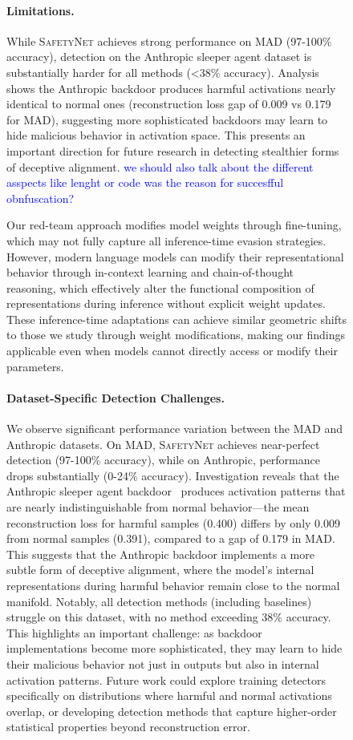\begin{figure}[htbp]
{\paragraph{Limitations.}
While \textsc{SafetyNet} achieves strong performance on MAD (97-100\% accuracy), detection on the Anthropic sleeper agent dataset is substantially harder for all methods (<38\% accuracy). Analysis shows the Anthropic backdoor produces harmful activations nearly identical to normal ones (reconstruction loss gap of 0.009 vs 0.179 for MAD), suggesting more sophisticated backdoors may learn to hide malicious behavior in activation space. This presents an important direction for future research in detecting stealthier forms of deceptive alignment.
\textcolor{blue}{we should also talk about the different asspects like lenght or code was the reason for succesfful obnfuscation?}

Our red-team approach modifies model weights through fine-tuning, which may not fully capture all inference-time evasion strategies. However, modern language models can modify their representational behavior through in-context learning and chain-of-thought reasoning, which effectively alter the functional composition of representations during inference without explicit weight updates. These inference-time adaptations can achieve similar geometric shifts to those we study through weight modifications, making our findings applicable even when models cannot directly access or modify their parameters.


\paragraph{Dataset-Specific Detection Challenges.}
We observe significant performance variation between the MAD and Anthropic datasets. On MAD, \textsc{SafetyNet} achieves near-perfect detection (97-100\% accuracy), while on Anthropic, performance drops substantially (0-24\% accuracy). Investigation reveals that the Anthropic sleeper agent backdoor~\cite{anthropic_sleeper} produces activation patterns that are nearly indistinguishable from normal behavior---the mean reconstruction loss for harmful samples (0.400) differs by only 0.009 from normal samples (0.391), compared to a gap of 0.179 in MAD. This suggests that the Anthropic backdoor implements a more subtle form of deceptive alignment, where the model's internal representations during harmful behavior remain close to the normal manifold. Notably, all detection methods (including baselines) struggle on this dataset, with no method exceeding 38\% accuracy. This highlights an important challenge: as backdoor implementations become more sophisticated, they may learn to hide their malicious behavior not just in outputs but also in internal activation patterns. Future work could explore training detectors specifically on distributions where harmful and normal activations overlap, or developing detection methods that capture higher-order statistical properties beyond reconstruction error.

}
\end{figure}
